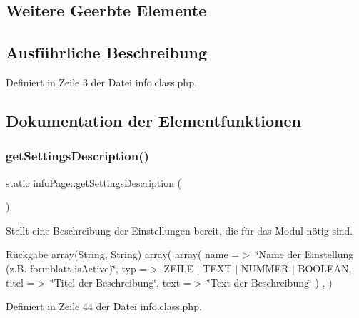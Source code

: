 \subsection*{Weitere Geerbte Elemente}


\subsection{Ausführliche Beschreibung}


Definiert in Zeile 3 der Datei info.\+class.\+php.



\subsection{Dokumentation der Elementfunktionen}
\mbox{\label{classinfo_page_a4697f95b436d1a2b7221a3534f3a5fce}} 
\subsubsection{\texorpdfstring{get\+Settings\+Description()}{getSettingsDescription()}}
{\footnotesize\ttfamily static info\+Page\+::get\+Settings\+Description (\begin{DoxyParamCaption}{ }\end{DoxyParamCaption})\hspace{0.3cm}{\ttfamily [static]}}

Stellt eine Beschreibung der Einstellungen bereit, die für das Modul nötig sind. \begin{DoxyReturn}{Rückgabe}
array(\+String, String) array( array( \textquotesingle{}name\textquotesingle{} =$>$ \char`\"{}\+Name der Einstellung (z.\+B. formblatt-\/is\+Active)\char`\"{}, \textquotesingle{}typ\textquotesingle{} =$>$ Z\+E\+I\+LE $\vert$ T\+E\+XT $\vert$ N\+U\+M\+M\+ER $\vert$ B\+O\+O\+L\+E\+AN, \textquotesingle{}titel\textquotesingle{} =$>$ \char`\"{}\+Titel der Beschreibung\char`\"{}, \textquotesingle{}text\textquotesingle{} =$>$ \char`\"{}\+Text der Beschreibung\char`\"{} ) , ) 
\end{DoxyReturn}


Definiert in Zeile 44 der Datei info.\+class.\+php.

\mbox{\label{classinfo_page_a059f62e9b4eec098b2508a94ae48c1ec}} 
